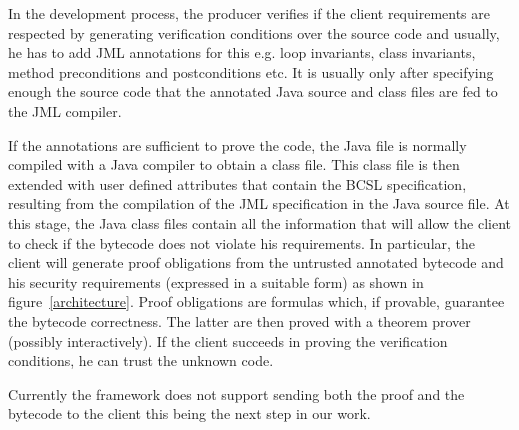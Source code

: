 In the development process, the producer verifies if the client requirements are respected by generating verification conditions
over the source code and usually, he has to add JML annotations for this e.g. loop invariants, class invariants, method preconditions
 and postconditions etc. It is usually only after specifying enough the source code that the annotated Java source and class files are fed to the JML compiler.

If the annotations are sufficient to prove the code, 
the Java file is normally compiled with a Java compiler to obtain a 
class file. This class file is then extended with user defined attributes that contain the BCSL specification, 
resulting from the compilation of the JML specification in the Java source file. 
At this stage, the Java class files contain all the information that will allow the client to check if the bytecode does not violate 
his requirements. 
In particular, the client will generate proof obligations from the untrusted annotated bytecode and his security requirements 
(expressed in a suitable form) as shown in figure~\ref{architecture}. Proof obligations are formulas which, if provable, guarantee the bytecode correctness.
The latter are then proved with a theorem prover (possibly interactively). If the client succeeds in proving 
the verification conditions, he can trust the unknown code. 

Currently the framework does not support sending both the proof and the 
bytecode to the client this being the next step in our work. 



